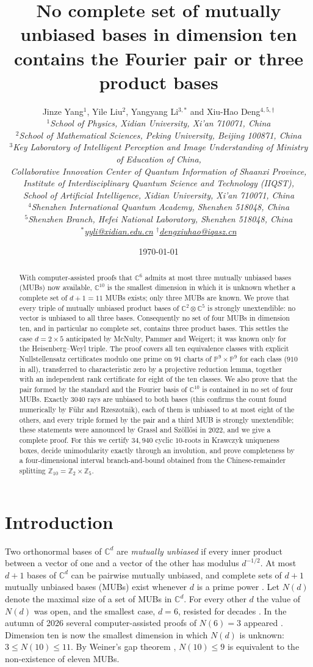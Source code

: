 \documentclass[11pt]{article}
\title{No complete set of mutually unbiased bases in dimension ten\\
contains the Fourier pair or three product bases}
\author{Jinze Yang$^{1}$, Yile Liu$^{2}$, Yangyang Li$^{3,*}$ and Xiu-Hao Deng$^{4,5,\dagger}$\\[1.5ex]
\small\itshape $^{1}$School of Physics, Xidian University, Xi'an 710071, China\\
\small\itshape $^{2}$School of Mathematical Sciences, Peking University, Beijing 100871, China\\
\small\itshape $^{3}$Key Laboratory of Intelligent Perception and Image Understanding of Ministry of Education of China,\\
\small\itshape Collaborative Innovation Center of Quantum Information of Shaanxi Province,\\
\small\itshape Institute of Interdisciplinary Quantum Science and Technology (IIQST),\\
\small\itshape School of Artificial Intelligence, Xidian University, Xi'an 710071, China\\
\small\itshape $^{4}$Shenzhen International Quantum Academy, Shenzhen 518048, China\\
\small\itshape $^{5}$Shenzhen Branch, Hefei National Laboratory, Shenzhen 518048, China\\[1ex]
\small $^{*}$\href{mailto:yyli@xidian.edu.cn}{yyli@xidian.edu.cn}\qquad
$^{\dagger}$\href{mailto:dengxiuhao@iqasz.cn}{dengxiuhao@iqasz.cn}}
\date{\today}
\theoremstyle{definition}
\theoremstyle{remark}
\newcommand{\C}{\mathbb{C}}
\newcommand{\Z}{\mathbb{Z}}
\newcommand{\PP}{\mathbb{P}}
\begin{document}
\maketitle

\begin{abstract}
With computer-assisted proofs that $\C^6$ admits at most three mutually unbiased bases (MUBs) now available, $\C^{10}$ is the smallest
dimension in which it is unknown whether a complete set of $d+1=11$ MUBs exists; only three MUBs are known. We prove
that every triple of mutually unbiased product bases of $\C^2\otimes\C^5$ is strongly unextendible: no vector is
unbiased to all three bases. Consequently no set of four MUBs in dimension ten, and in particular no complete set,
contains three product bases. This settles the case $d=2\times5$ anticipated by McNulty, Pammer and Weigert; it was
known only for the Heisenberg--Weyl triple. The proof covers all ten equivalence classes with explicit Nullstellensatz
certificates modulo one prime on $91$ charts of $\PP^9\times\PP^9$ for each class ($910$ in all), transferred to characteristic zero by a
projective reduction lemma, together with an independent rank certificate for eight of the ten classes. We also prove that the pair formed by the standard and the Fourier basis of $\C^{10}$ is contained in no set of four
MUBs. Exactly $3040$ rays are unbiased to both bases (this confirms the count found numerically by F\"uhr and Rzeszotnik), each of them is unbiased to at most eight of the others, and every triple formed by the pair and a third
MUB is strongly unextendible; these statements were announced by Grassl and Sz\"oll\H{o}si in 2022, and we give a
complete proof. For this we certify $34{,}940$ cyclic $10$-roots in Krawczyk uniqueness boxes, decide
unimodularity exactly through an involution, and prove completeness by a four-dimensional interval branch-and-bound
obtained from the Chinese-remainder splitting $\Z_{10}=\Z_2\times\Z_5$.
\end{abstract}

\section{Introduction}

Two orthonormal bases of $\C^d$ are \emph{mutually unbiased} if every inner product between a vector of one and a
vector of the other has modulus $d^{-1/2}$. At most $d+1$ bases of $\C^d$ can be pairwise mutually unbiased, and
complete sets of $d+1$ mutually unbiased bases (MUBs) exist whenever $d$ is a prime power
\cite{Ivanovic1981,WoottersFields1989}. Let $N(d)$ denote the maximal size of a set of MUBs in $\C^d$. For every other
$d$ the value of $N(d)$ was open, and the smallest case, $d=6$, resisted for decades \cite{DEBZ2010}. In the autumn of
2026 several computer-assisted proofs of $N(6)=3$ appeared
\cite{OAIMUB,Jaswal2026a,CWT2026,Jaswal2026b}. Dimension ten is now the smallest dimension in which $N(d)$ is unknown:
$3\le N(10)\le 11$. By Weiner's gap theorem \cite{Weiner2013}, $N(10)\le 9$ is equivalent to the non-existence of
eleven MUBs.
\end{document}
